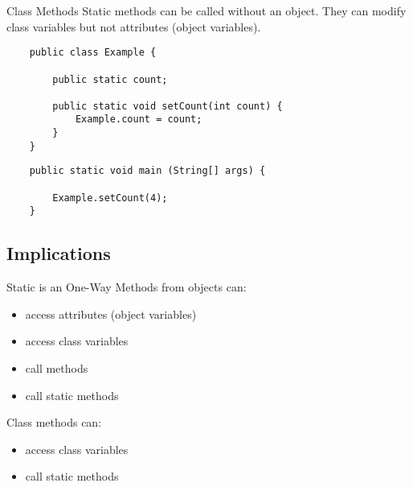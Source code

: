 \begin{frame}[fragile]{Class Methods}
	Static methods can be called without an object.
	They can modify class variables but not attributes (object variables).
	\begin{lstlisting}
	public class Example {
	
	    public static count;

	    public static void setCount(int count) {
	        Example.count = count;
	    }
	}
	\end{lstlisting}
	\begin{lstlisting}
	public static void main (String[] args) {
	        
	    Example.setCount(4);
	}
	\end{lstlisting}
\end{frame}

\subsection{Implications}
\begin{frame}[fragile]{Static is an One-Way}
	Methods from objects can:
	\begin{itemize}
		\item access attributes (object variables)
		\item access class variables
		\item call methods
		\item call static methods
	\end{itemize}
	Class methods can:
	\begin{itemize}
		\item access class variables
		\item call static methods
	\end{itemize}
\end{frame}



